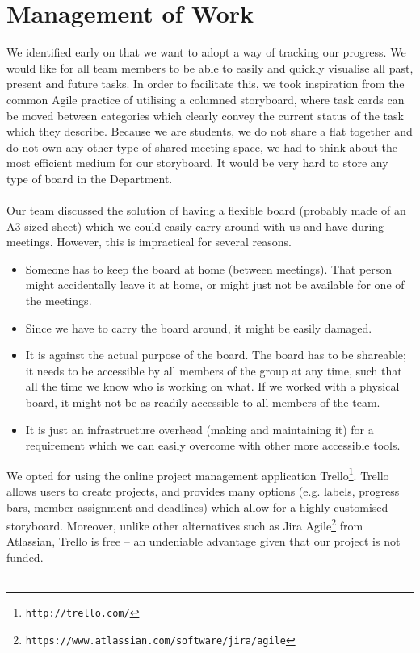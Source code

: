 \documentclass[10pt]{article}
\begin{document}
\section{Management of Work}
We identified early on that we want to adopt a way of tracking our progress. We would like for all team members to be able to easily and quickly visualise all past, present and future tasks. In order to facilitate this, we took inspiration from the common Agile practice of utilising a columned storyboard, where task cards can be moved between categories which clearly convey the current status of the task which they describe. Because we are students, we do not share a flat together and do not own any other type of shared meeting space, we had to think about the most efficient medium for our storyboard. It would be very hard to store any type of board in the Department.\\\\
Our team discussed the solution of having a flexible board (probably made of an A3-sized sheet) which we could easily carry around with us and have during meetings. However, this is impractical for several reasons. \begin{itemize}
\item Someone has to keep the board at home (between meetings). That person might accidentally leave it at home, or might just not be available for one of the meetings.
\item Since we have to carry the board around, it might be easily damaged.
\item It is against the actual purpose of the board. The board has to be shareable; it needs to be accessible by all members of the group at any time, such that all the time we know who is working on what. If we worked with a physical board, it might not be as readily accessible to all members of the team. 
\item It is just an infrastructure overhead (making and maintaining it) for a requirement which we can easily overcome with other more accessible tools.
\end{itemize}
We opted for using the online project management application Trello\footnote{\texttt{http://trello.com/}}. Trello allows users to create projects, and provides many options (e.g. labels, progress bars, member assignment and deadlines) which allow for a highly customised storyboard. Moreover, unlike other alternatives such as Jira Agile\footnote{\texttt{https://www.atlassian.com/software/jira/agile}} from Atlassian, Trello is free -- an undeniable advantage given that our project is not funded. \\\\
\end{document}
